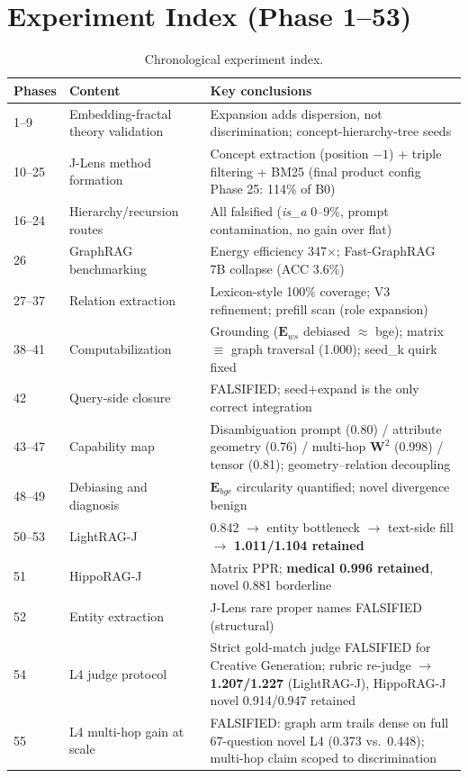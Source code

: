 \section{Experiment Index (Phase 1--53)}
\label{app:phases}

\begin{table}[h]
\centering
\caption{Chronological experiment index.}
\label{tab:phases}
\begin{tabular}{@{}llp{7.5cm}@{}}
\toprule
Phases & Content & Key conclusions \\
\midrule
1--9 & Embedding-fractal theory validation & Expansion adds dispersion, not discrimination; concept-hierarchy-tree seeds \\
10--25 & J-Lens method formation & Concept extraction (position $-1$) + triple filtering + BM25 (final product config Phase 25: 114\% of B0) \\
16--24 & Hierarchy/recursion routes & All falsified (\emph{is\_a} 0--9\%, prompt contamination, no gain over flat) \\
26 & GraphRAG benchmarking & Energy efficiency 347$\times$; Fast-GraphRAG 7B collapse (ACC 3.6\%) \\
27--37 & Relation extraction & Lexicon-style 100\% coverage; V3 refinement; prefill scan (role expansion) \\
38--41 & Computabilization & Grounding ($\mathbf{E}_{ws}$ debiased $\approx$ bge); matrix $\equiv$ graph traversal (1.000); seed\_k quirk fixed \\
42 & Query-side closure & FALSIFIED; seed+expand is the only correct integration \\
43--47 & Capability map & Disambiguation prompt (0.80) / attribute geometry (0.76) / multi-hop $\mathbf{W}^2$ (0.998) / tensor (0.81); geometry--relation decoupling \\
48--49 & Debiasing and diagnosis & $\mathbf{E}_{bge}$ circularity quantified; novel divergence benign \\
50--53 & LightRAG-J & 0.842 $\to$ entity bottleneck $\to$ text-side fill $\to$ \textbf{1.011/1.104 retained} \\
51 & HippoRAG-J & Matrix PPR; \textbf{medical 0.996 retained}, novel 0.881 borderline \\
52 & Entity extraction & J-Lens rare proper names FALSIFIED (structural) \\
54 & L4 judge protocol & Strict gold-match judge FALSIFIED for Creative Generation; rubric re-judge $\to$ \textbf{1.207/1.227} (LightRAG-J), HippoRAG-J novel 0.914/0.947 retained \\
55 & L4 multi-hop gain at scale & FALSIFIED: graph arm trails dense on full 67-question novel L4 (0.373 vs.\ 0.448); multi-hop claim scoped to discrimination \\
\bottomrule
\end{tabular}
\end{table}

